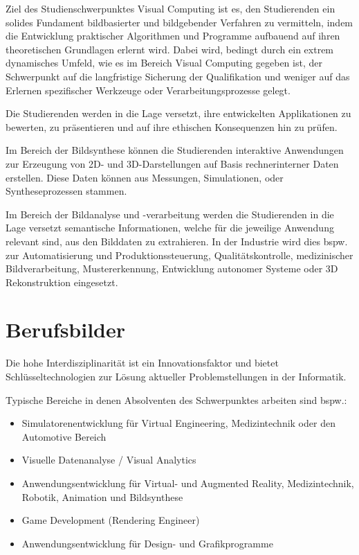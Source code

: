Ziel des Studienschwerpunktes Visual Computing ist es, den Studierenden
ein solides Fundament bildbasierter und bildgebender Verfahren zu
vermitteln, indem die Entwicklung praktischer Algorithmen und Programme
aufbauend auf ihren theoretischen Grundlagen erlernt wird. Dabei wird,
bedingt durch ein extrem dynamisches Umfeld, wie es im Bereich Visual
Computing gegeben ist, der Schwerpunkt auf die langfristige Sicherung
der Qualifikation und weniger auf das Erlernen spezifischer Werkzeuge
oder Verarbeitungsprozesse gelegt.

Die Studierenden werden in die Lage versetzt, ihre entwickelten
Applikationen zu bewerten, zu präsentieren und auf ihre ethischen
Konsequenzen hin zu prüfen.

Im Bereich der Bildsynthese können die Studierenden interaktive
Anwendungen zur Erzeugung von 2D- und 3D-Darstellungen auf Basis
rechnerinterner Daten erstellen. Diese Daten können aus Messungen,
Simulationen, oder Syntheseprozessen stammen.

Im Bereich der Bildanalyse und -verarbeitung werden die Studierenden in
die Lage versetzt semantische Informationen, welche für die jeweilige
Anwendung relevant sind, aus den Bilddaten zu extrahieren. In der
Industrie wird dies bspw. zur Automatisierung und Produktionssteuerung,
Qualitätskontrolle, medizinischer Bildverarbeitung, Mustererkennung,
Entwicklung autonomer Systeme oder 3D Rekonstruktion eingesetzt.

\section*{Berufsbilder\label{/mi-2017/modulbeschreibungen-master/schwerpunkt-visual-computing}}\label{berufsbilderpathlabelmi-2017modulbeschreibungen-masterschwerpunkt-visual-computing}

Die hohe Interdisziplinarität ist ein Innovationsfaktor und bietet
Schlüsseltechnologien zur Lösung aktueller Problemstellungen in der
Informatik.

Typische Bereiche in denen Absolventen des Schwerpunktes arbeiten sind
bspw.:

\begin{itemize}
\tightlist
\item
  Simulatorenentwicklung für Virtual Engineering, Medizintechnik oder
  den Automotive Bereich
\item
  Visuelle Datenanalyse / Visual Analytics
\item
  Anwendungsentwicklung für Virtual- und Augmented Reality,
  Medizintechnik, Robotik, Animation und Bildsynthese
\item
  Game Development (Rendering Engineer)
\item
  Anwendungsentwicklung für Design- und Grafikprogramme
\end{itemize}

